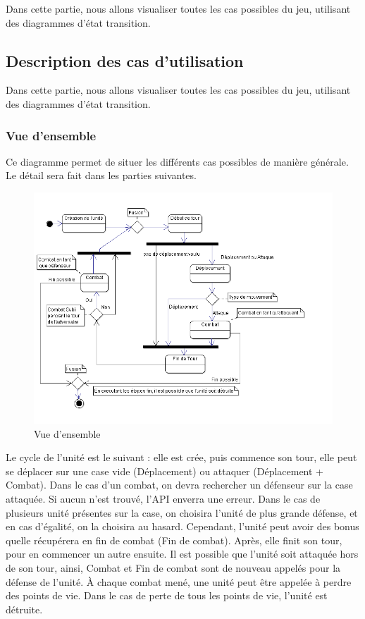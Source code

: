 Dans cette partie, nous allons visualiser toutes les cas possibles du jeu, utilisant des diagrammes d'état transition.
\subsection{Description des cas d'utilisation}
Dans cette partie, nous allons visualiser toutes les cas possibles du jeu, utilisant des diagrammes d'état transition.
\subsubsection{Vue d'ensemble}
Ce diagramme permet de situer les différents cas possibles de manière générale. Le détail sera fait dans les parties suivantes.


\begin{figure}[!h]
\centering
\includegraphics[width=1\textwidth]{img/VueDensemble.png}
\caption{Vue d'ensemble}
\end{figure}

Le cycle de l'unité est le suivant : elle est crée, puis commence son tour, elle peut se déplacer sur une case vide (Déplacement) ou attaquer (Déplacement + Combat). Dans le cas d'un combat, on devra rechercher un défenseur sur la case attaquée. Si aucun n'est trouvé, l'API enverra une erreur. Dans le cas de plusieurs unité présentes sur la case, on choisira l'unité de plus grande défense, et en cas d'égalité, on la choisira au hasard. Cependant, l'unité peut avoir des bonus quelle récupérera en fin de combat (Fin de combat). Après, elle finit son tour, pour en commencer un autre ensuite. Il est possible que l'unité soit attaquée hors de son tour, ainsi, Combat et Fin de combat sont de nouveau appelés pour la défense de l'unité. À chaque combat mené, une unité peut être appelée à perdre des points de vie. Dans le cas de perte de tous les points de vie, l'unité est détruite.

